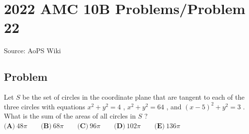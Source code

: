 \documentclass[12pt]{article}
\begin{document}
\section*{{2022 AMC 10B Problems/Problem 22}}
Source: AoPS Wiki

\subsection*{Problem}
Let $S$ be the set of circles in the coordinate plane that are tangent to each of the three circles with equations $x^{2}+y^{2}=4$ , $x^{2}+y^{2}=64$ , and $(x-5)^{2}+y^{2}=3$ . What is the sum of the areas of all circles in $S$ ? $\textbf{(A)}~48\pi\qquad\textbf{(B)}~68\pi\qquad\textbf{(C)}~96\pi\qquad\textbf{(D)}~102\pi\qquad\textbf{(E)}~136\pi\qquad$
\end{document}

